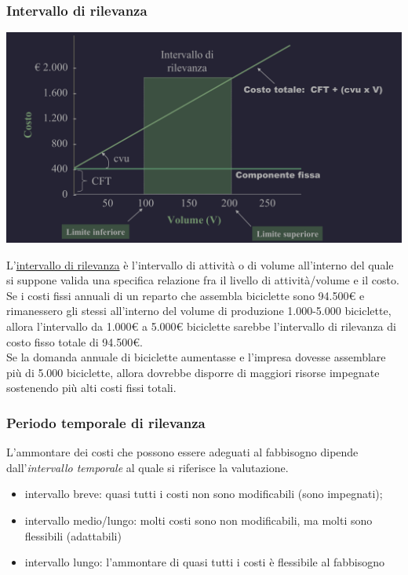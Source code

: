\documentclass{article}
\begin{document}
\subsubsection{Intervallo di rilevanza}
\begin{center}
    \includegraphics[scale=0.3]{Image/CostoUni_2.png}
\end{center}
L'\underline{intervallo di rilevanza} è l'intervallo di attività o di volume all'interno del quale si suppone valida una specifica relazione fra il livello di attività/volume e il costo.
\vspace*{0.2cm}\\
Se i costi fissi annuali di un reparto che assembla biciclette sono 94.500€ e rimanessero gli stessi all'interno del volume di produzione 1.000-5.000 biciclette, allora l'intervallo da 1.000€ a 5.000€ biciclette sarebbe l'intervallo di rilevanza di costo fisso totale di 94.500€.\\
Se la domanda annuale di biciclette aumentasse e l'impresa dovesse assemblare più di 5.000 biciclette, allora dovrebbe disporre di maggiori risorse impegnate sostenendo più alti costi fissi totali.


\subsubsection{Periodo temporale di rilevanza}
L'ammontare dei costi che possono essere adeguati al fabbisogno dipende dall'\textit{intervallo temporale} al quale si riferisce la valutazione.
\begin{itemize}
    \item intervallo breve: quasi tutti i costi non sono modificabili (sono impegnati);
    \item intervallo medio/lungo: molti costi sono non modificabili, ma molti sono flessibili (adattabili)
    \item intervallo lungo: l'ammontare di quasi tutti i costi è flessibile al fabbisogno
\end{itemize}
\end{document}
